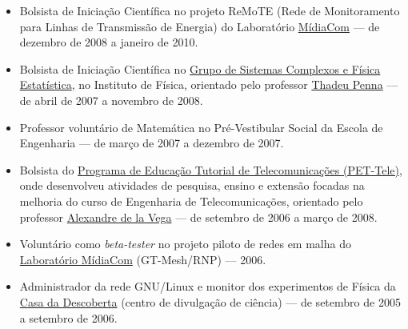 \documentclass[a4paper,11pt]{article}
\begin{document}
	\begin{itemize}
		\item Bolsista de Iniciação Científica no projeto ReMoTE (Rede de
			Monitoramento para Linhas de Transmissão de Energia) do Laboratório
			\href{http://www.midiacom.uff.br/ }{MídiaCom} --- de dezembro de
			2008 a janeiro de 2010.
		\item Bolsista de Iniciação Científica no
			\href{http://complex.if.uff.br/}{Grupo de Sistemas Complexos e
			Física Estatística}, no Instituto de Física, orientado pelo
			professor \href{http://profs.if.uff.br/tjpp/}{Thadeu Penna} --- de
			abril de 2007 a novembro de 2008.
		\item Professor voluntário de Matemática no Pré-Vestibular Social da
			Escola de Engenharia --- de março de 2007 a dezembro de 2007.
		\item Bolsista do \href{http://pet.telecom.uff.br/}{Programa de
			Educação Tutorial de Telecomunicações (PET-Tele)}, onde desenvolveu
			atividades de pesquisa, ensino e extensão focadas na melhoria do
			curso de Engenharia de Telecomunicações, orientado pelo professor
			\href{http://www.telecom.uff.br/~delavega/}{Alexandre de la Vega}
			--- de setembro de 2006 a março de 2008.
		\item Voluntário como \textit{beta-tester} no projeto piloto de redes
			em malha do \href{http://www.midiacom.uff.br/}{Laboratório
			MídiaCom} (GT-Mesh/RNP) --- 2006.
		\item Administrador da rede GNU/Linux e monitor dos experimentos de
			Física da \href{http://www.uff.br/casadadescoberta/}{Casa da
			Descoberta} (centro de divulgação de ciência) --- de setembro de
			2005 a setembro de 2006.
	\end{itemize}
\end{document}
